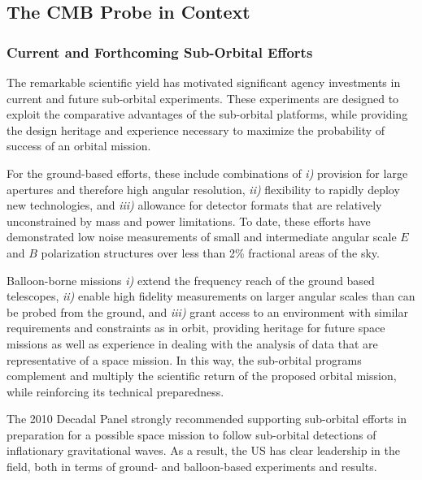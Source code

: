 
\subsection{The CMB Probe in Context}
\label{sec:spacemission}

\vspace{-0.05in}

\subsubsection{Current and Forthcoming Sub-Orbital Efforts}

The remarkable scientific yield has motivated significant agency investments 
in current and future sub-orbital experiments. 
These experiments are designed 
to exploit the comparative advantages of the sub-orbital platforms, while providing the design heritage and 
experience necessary to maximize the probability of success of an orbital mission. 

For the ground-based efforts, these include combinations of {\it i)}
provision for large apertures and therefore high angular
resolution, {\it ii)} flexibility to rapidly deploy new technologies, and {\it iii)}
allowance for detector formats that are relatively unconstrained by
mass and power limitations.  To date, these efforts have demonstrated low
noise measurements of small and intermediate angular scale $E$ and $B$ polarization 
structures over less than 2\% fractional areas of the sky. 

Balloon-borne missions {\it i)} extend the frequency reach of the ground based telescopes, 
{\it ii)} enable high fidelity measurements on larger angular scales than can be probed from the 
ground, and {\it iii)} grant access to an environment with similar requirements and constraints
as in orbit, providing heritage for future space missions as well as experience in dealing with the 
analysis of data that are representative of a space mission. In this way, the sub-orbital programs 
complement and multiply the scientific return of the proposed orbital mission, while reinforcing its 
technical preparedness.  

The 2010 Decadal Panel strongly recommended supporting sub-orbital efforts in preparation 
for a possible space mission to follow sub-orbital detections of inflationary gravitational waves. 
As a result, the US has clear leadership in the field, both in terms of ground- and balloon-based 
experiments and results. 

